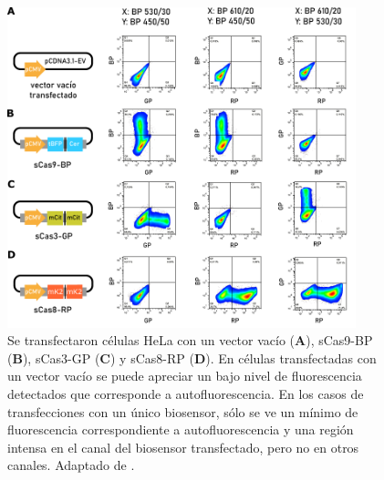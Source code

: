 \begin{figure}
    \centering
    \includegraphics[width=0.9\textwidth]{img/cap_3/FACS_singles.pdf}
    \caption{\footnotesize{Se transfectaron células HeLa con un vector vacío (\textbf{A}), sCas9-BP (\textbf{B}), sCas3-GP (\textbf{C}) y sCas8-RP (\textbf{D}). En células transfectadas con un vector vacío se puede apreciar un bajo nivel de fluorescencia detectados que corresponde a autofluorescencia. En los casos de transfecciones con un único biosensor, sólo se ve un mínimo de fluorescencia correspondiente a autofluorescencia y una región intensa en el canal del biosensor transfectado, pero no en otros canales. Adaptado de \cite{Habif2021}.}}
    \label{fig:FACS_singles}
\end{figure}

